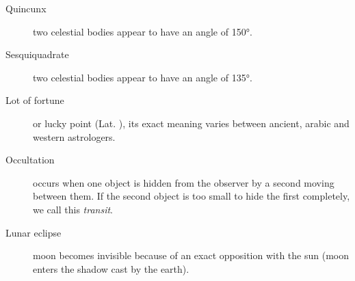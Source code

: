 \documentclass[notitlepage,british]{scrartcl}
\begin{document}
\begin{refsection}
\begin{description}
  \item[Quincunx]{two celestial bodies appear to have an angle of \ang{150}.}
  \item[Sesquiquadrate]{two celestial bodies appear to have an angle of \ang{135}.}
  \item[Lot of fortune]{ or lucky point (Lat. ), its exact meaning varies between ancient, arabic and western astrologers. }
  \item[Occultation]{occurs when one object is hidden from the observer by a second moving between them. If the second object is too small to hide the first completely, we call this \emph{transit}. }
  \item[Lunar eclipse]{moon becomes invisible because of an exact opposition with the sun (moon enters the shadow cast by the earth). }
\end{description}


\end{refsection}
\end{document}
